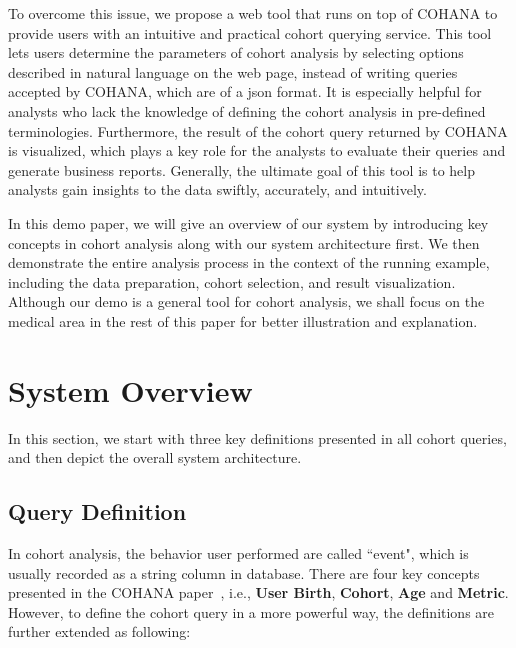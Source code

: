 To overcome this issue, we propose a web tool that runs on top of COHANA to provide users with an intuitive and practical cohort querying service. 
This tool lets users determine the parameters of cohort analysis by selecting options described in natural language on the web page, instead of writing queries accepted by COHANA, which are of a json format.  
It is especially helpful for analysts who lack the knowledge of defining the cohort analysis in pre-defined terminologies.%
Furthermore, the result of the cohort query returned by COHANA is visualized,
which plays a key role for the analysts to evaluate their queries and generate business reports.
Generally, the ultimate goal of this tool is to help analysts gain insights to the data swiftly, accurately, and intuitively.

In this demo paper, we will give an overview of our system by introducing key concepts in cohort analysis along with our system architecture first. We then demonstrate the entire analysis process in the context of the running example, including the data preparation, cohort selection, and result visualization.
Although our demo is a general tool for cohort analysis, we shall focus on the medical area in the rest of this paper for better illustration and explanation.

\section{System Overview}
In this section, we start with three key definitions presented in all cohort queries, and then depict the overall system architecture.  

\subsection{Query Definition}
In cohort analysis, the behavior user performed are called ``event", which is usually recorded as a string column in database. 
There are four key concepts presented in the COHANA paper~\cite{jiang2016cohort}, i.e., \textbf{User Birth}, \textbf{Cohort}, \textbf{Age} and \textbf{Metric}.
However, to define the cohort query in a more powerful way, the definitions are further extended as following:


